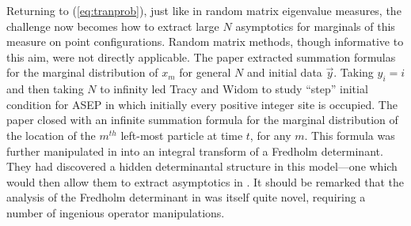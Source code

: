 \documentclass[11pt,letterpaper,reqno]{amsart}
\theoremstyle{definition}
\theoremstyle{remark}
\numberwithin{equation}{section}
\begin{document}
Returning to (\ref{eq:tranprob}), just like in random matrix eigenvalue measures, the challenge now becomes how to extract large $N$ asymptotics for marginals of this measure on point configurations. Random matrix methods, though informative to this aim, were not directly applicable. The paper \cite{133} extracted summation formulas for the marginal distribution of $x_m$ for general $N$ and initial data $\vec{y}$. Taking $y_i=i$ and then taking $N$ to infinity led Tracy and Widom to study ``step'' initial condition for ASEP in which initially every positive integer site is occupied. The paper \cite{133} closed with an infinite summation formula for the marginal distribution of the location of the $m^{th}$ left-most particle at time $t$, for any $m$. This formula was further manipulated in \cite{134} into an integral transform of a Fredholm determinant. They had discovered a hidden determinantal structure in this model---one which would then allow them to extract asymptotics in \cite{135}. It should be remarked that the analysis of the Fredholm determinant in \cite{135} was itself quite novel, requiring a number of ingenious operator manipulations.

%
%
%
\end{document}
